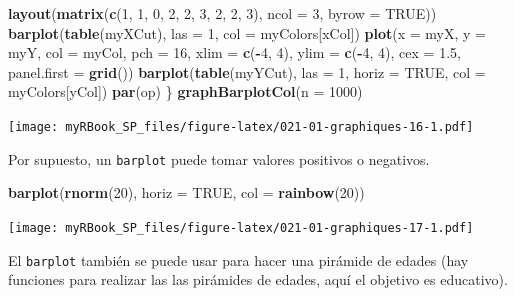 \documentclass[
]{book}
\newenvironment{Shaded}{\begin{snugshade}}{\end{snugshade}}
\newcommand{\DataTypeTok}[1]{\textcolor[rgb]{0.13,0.29,0.53}{#1}}
\newcommand{\DecValTok}[1]{\textcolor[rgb]{0.00,0.00,0.81}{#1}}
\newcommand{\FloatTok}[1]{\textcolor[rgb]{0.00,0.00,0.81}{#1}}
\newcommand{\KeywordTok}[1]{\textcolor[rgb]{0.13,0.29,0.53}{\textbf{#1}}}
\newcommand{\NormalTok}[1]{#1}
\newcommand{\OperatorTok}[1]{\textcolor[rgb]{0.81,0.36,0.00}{\textbf{#1}}}
\newcommand{\OtherTok}[1]{\textcolor[rgb]{0.56,0.35,0.01}{#1}}
\begin{document}
\begin{Shaded}
\begin{Highlighting}[]
  \KeywordTok{layout}\NormalTok{(}\KeywordTok{matrix}\NormalTok{(}\KeywordTok{c}\NormalTok{(}\DecValTok{1}\NormalTok{, }\DecValTok{1}\NormalTok{, }\DecValTok{0}\NormalTok{, }
                  \DecValTok{2}\NormalTok{, }\DecValTok{2}\NormalTok{, }\DecValTok{3}\NormalTok{, }
                  \DecValTok{2}\NormalTok{, }\DecValTok{2}\NormalTok{, }\DecValTok{3}\NormalTok{), }\DataTypeTok{ncol =} \DecValTok{3}\NormalTok{, }\DataTypeTok{byrow =} \OtherTok{TRUE}\NormalTok{))}
  \KeywordTok{barplot}\NormalTok{(}\KeywordTok{table}\NormalTok{(myXCut), }\DataTypeTok{las =} \DecValTok{1}\NormalTok{, }\DataTypeTok{col =}\NormalTok{ myColors[xCol])}
  \KeywordTok{plot}\NormalTok{(}\DataTypeTok{x =}\NormalTok{ myX, }\DataTypeTok{y =}\NormalTok{ myY, }\DataTypeTok{col =}\NormalTok{ myCol, }\DataTypeTok{pch =} \DecValTok{16}\NormalTok{, }
    \DataTypeTok{xlim =} \KeywordTok{c}\NormalTok{(}\OperatorTok{-}\DecValTok{4}\NormalTok{, }\DecValTok{4}\NormalTok{), }\DataTypeTok{ylim =} \KeywordTok{c}\NormalTok{(}\OperatorTok{-}\DecValTok{4}\NormalTok{, }\DecValTok{4}\NormalTok{), }\DataTypeTok{cex =} \FloatTok{1.5}\NormalTok{, }
    \DataTypeTok{panel.first =} \KeywordTok{grid}\NormalTok{())}
  \KeywordTok{barplot}\NormalTok{(}\KeywordTok{table}\NormalTok{(myYCut), }\DataTypeTok{las =} \DecValTok{1}\NormalTok{, }\DataTypeTok{horiz =} \OtherTok{TRUE}\NormalTok{, }\DataTypeTok{col =}\NormalTok{ myColors[yCol])}
  \KeywordTok{par}\NormalTok{(op)}
\NormalTok{\}}
\KeywordTok{graphBarplotCol}\NormalTok{(}\DataTypeTok{n =} \DecValTok{1000}\NormalTok{)}
\end{Highlighting}
\end{Shaded}

\texttt{[image: myRBook\_SP\_files/figure-latex/021-01-graphiques-16-1.pdf]}

Por supuesto, un \texttt{barplot} puede tomar valores positivos o negativos.

\begin{Shaded}
\begin{Highlighting}[]
\KeywordTok{barplot}\NormalTok{(}\KeywordTok{rnorm}\NormalTok{(}\DecValTok{20}\NormalTok{), }\DataTypeTok{horiz =} \OtherTok{TRUE}\NormalTok{, }\DataTypeTok{col =} \KeywordTok{rainbow}\NormalTok{(}\DecValTok{20}\NormalTok{))}
\end{Highlighting}
\end{Shaded}

\texttt{[image: myRBook\_SP\_files/figure-latex/021-01-graphiques-17-1.pdf]}

El \texttt{barplot} también se puede usar para hacer una pirámide de edades (hay funciones para realizar las las pirámides de edades, aquí el objetivo es educativo).
\end{document}
